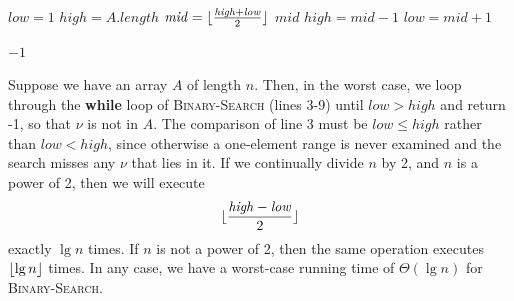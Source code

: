 \begin{algorithmic}[1]
  \STATE $\mathit{low} = 1$
  \STATE $\mathit{high} = A.\mathit{length}$
  \STATE $\mathit{mid} = \lfloor\frac{\mathit{high} + \mathit{low}}{2}\rfloor$
  \RETURN $\mathit{mid}$
  \STATE $\mathit{high} = \mathit{mid} - 1$
  \ELSE
  \STATE $\mathit{low} = \mathit{mid} + 1$
  \ENDIF
  \ENDWHILE

  \RETURN $-1$
\end{algorithmic}

Suppose we have an array $A$ of length $n$. Then, in the worst case,
we loop through
the \textbf{while} loop of \textsc{Binary-Search} (lines 3-9) until
$\mathit{low} > \mathit{high}$ and return -1, so that $\nu$ is not in $A$. The
comparison of line 3 must be $\mathit{low} \leq \mathit{high}$ rather than
$\mathit{low} < \mathit{high}$, since otherwise a one-element range is never
examined and the search misses any $\nu$ that lies in it. If we
continually divide $n$ by 2, and $n$ is a power of 2, then we will execute
\[
  \lfloor\frac{\mathit{high} - \mathit{low}}{2}\rfloor
\]
exactly $\lg{n}$ times. If $n$ is not a power of 2, then the same operation
executes $\lfloor\lg{n}\rfloor$ times. In any case, we have a worst-case
running time of
$\Theta(\lg{n})$ for \textsc{Binary-Search}.

